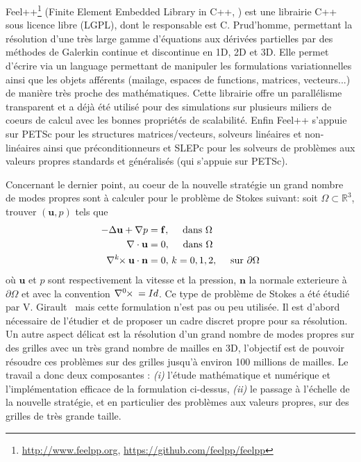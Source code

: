 \documentclass[12pt]{article}
\newcommand{\curlk}[1][k]{\ensuremath{\nabla^{#1}\hspace{-.3em}\times}\xspace}
\begin{document}
Feel++\footnote{\url{http://www.feelpp.org}, \url{https://github.com/feelpp/feelpp}} (Finite Element Embedded Library in
C++, \cite{prud2012feel++,feelpp098:10046} ) est une librairie C++ sous licence
libre (LGPL), dont le responsable est C. Prud'homme, permettant la résolution
d'une très large gamme d'équations aux dérivées partielles par des méthodes de
Galerkin continue et discontinue en 1D, 2D et 3D. Elle permet d'écrire via un
language permettant de manipuler les formulations variationnelles ainsi que les
objets afférents (mailage, espaces de functions, matrices, vecteurs...) de
manière très proche des mathématiques. Cette librairie offre un parallélisme
transparent et a déjà été utilisé pour des simulations sur plusieurs miliers de
coeurs de calcul avec les bonnes propriétés de scalabilité. Enfin Feel++
s'appuie sur PETSc pour les structures matrices/vecteurs, solveurs linéaires et
non-linéaires ainsi que préconditionneurs et SLEPc pour les solveurs de
problèmes aux valeurs propres standards et généralisés (qui s'appuie sur PETSc).

Concernant le dernier point, au coeur de la nouvelle stratégie un grand nombre
de modes propres sont à calculer pour le problème de Stokes suivant: soit
$\Omega \subset \mathbb{R}^3$, trouver $(\mathbf{u},p)$ tels que
\begin{align}
  \label{eq:1}
  -\Delta \mathbf{u} + \nabla p &= \mathbf{f},\quad \mbox{ dans } \Omega\\
  \nabla \cdot \mathbf{u} &= 0,\quad \mbox{ dans } \Omega\\
  \curlk{} \mathbf{u} \cdot \mathbf{n} &= 0,\, k=0,1,2,\quad \mbox{ sur
  } \partial \Omega
\end{align}
où $\mathbf{u}$ et $p$ sont respectivement la vitesse et la pression,
$\mathbf{n}$ la normale exterieure à $\partial \Omega$ et avec la convention
$\curlk[0]{} = Id$. Ce type de problème de Stokes a été étudié par
V. Girault~\cite{girault90-1} mais cette formulation n'est pas ou peu
utilisée. Il est d'abord nécessaire de l'étudier et de proposer un cadre discret
propre pour sa résolution. Un autre aspect délicat est la résolution d'un grand
nombre de modes propres sur des grilles avec un très grand nombre de mailles en
3D, l'objectif est de pouvoir résoudre ces problèmes sur des grilles jusqu'à
environ 100 millions de mailles.  Le travail a donc deux composantes :
\textit{(i)} l'étude mathématique et numérique et l'implémentation efficace de
la formulation ci-dessus, \textit{(ii)} le passage à l'échelle de la nouvelle
stratégie, et en particulier des problèmes aux valeurs propres, sur des grilles
de très grande taille.
\end{document}
